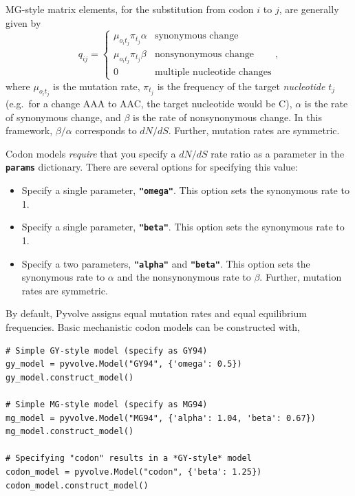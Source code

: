 \documentclass{article}
\newcommand{\code}[1]{\textbf{\texttt{\small{#1}}}}
\begin{document}
MG-style \citep{MG94} matrix elements, for the substitution from codon $i$ to $j$, are generally given by 
\begin{equation}\label{eq:MGstyle}
q_{ij} = \left\{ 
\begin{array}{rl}
\mu_{o_it_j}\pi_{t_j} \alpha         &\text{synonymous change} \\
\mu_{o_it_j}\pi_{t_j} \beta  &\text{nonsynonymous change} \\
0                             &\text{multiple nucleotide changes}       
\end{array} \right. ,
\end{equation}
where $\mu_{o_it_j}$ is the mutation rate, $\pi_{t_j}$ is the frequency of the target \emph{nucleotide} $t_j$ (e.g.\ for a change AAA to AAC, the target nucleotide would be C), $\alpha$ is the rate of synonymous change, and $\beta$ is the rate of nonsynonymous change. In this framework, $\beta / \alpha$ corresponds to $dN/dS$. Further, mutation rates are symmetric.

Codon models \emph{require} that you specify a $dN/dS$ rate ratio as a parameter in the \code{params} dictionary. There are several options for specifying this value:
\begin{itemize}
	\item Specify a single parameter, \code{"omega"}. This option sets the synonymous rate to 1.
	\item Specify a single parameter, \code{"beta"}. This option sets the synonymous rate to 1.
	\item Specify a two parameters, \code{"alpha"} and \code{"beta"}. This option sets the synonymous rate to $\alpha$ and the nonsynonymous rate to $\beta$. Further, mutation rates are symmetric.
\end{itemize}

By default, Pyvolve assigns equal mutation rates and equal equilibrium frequencies. Basic mechanistic codon models can be constructed with,
\begin{lstlisting}
# Simple GY-style model (specify as GY94)
gy_model = pyvolve.Model("GY94", {'omega': 0.5})
gy_model.construct_model()

# Simple MG-style model (specify as MG94)
mg_model = pyvolve.Model("MG94", {'alpha': 1.04, 'beta': 0.67})
mg_model.construct_model()

# Specifying "codon" results in a *GY-style* model
codon_model = pyvolve.Model("codon", {'beta': 1.25})
codon_model.construct_model()
\end{lstlisting}
\end{document}
